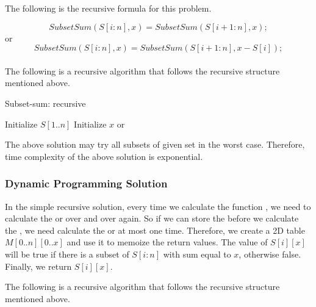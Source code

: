 \documentclass[11pt]{article}
\theoremstyle{definition}
\begin{document}
The following is the recursive formula for this problem.

\[
SubsetSum(S[i:n], x) = SubsetSum(S[i+1:n], x);
\]
or
\[
SubsetSum(S[i:n], x) = SubsetSum(S[i+1:n], x-S[i]);
\]
\\
The following is a recursive algorithm that follows the recursive structure mentioned above.
\begin{algorithm}[H]
\caption{Subset-sum: recursive}\label{Subset-sum:recursive}
\begin{algorithmic}[1]
\State Initialize $S[1..n]$
\State Initialize $x$
\State{}
\EndFunction
\State{\null}
\State {}
    \State\Return {}
    \EndIf
    \State\Return {}
    \EndIf
    \State {}
    \Else 
    \State\Return {} or 
    \EndIf
\EndFunction
\end{algorithmic}
\end{algorithm}
The above solution may try all subsets of given set in the worst case. Therefore, time complexity of the above solution is exponential.
\subsubsection{Dynamic Programming Solution}
In the simple recursive solution, every time we calculate the function , we need to calculate the  or  over and over again. So if we can store the  before we calculate the , we need calculate the  or  at most one time. Therefore, we create a 2D table $M[0..n][0..x]$ and use it to memoize the return values. The value of $S[i][x]$ will be true if there is a subset of $S[i:n]$ with sum equal to $x$, otherwise false. Finally, we return $S[i][x]$.

The following is a recursive algorithm that follows the recursive structure mentioned above.
\end{document}

